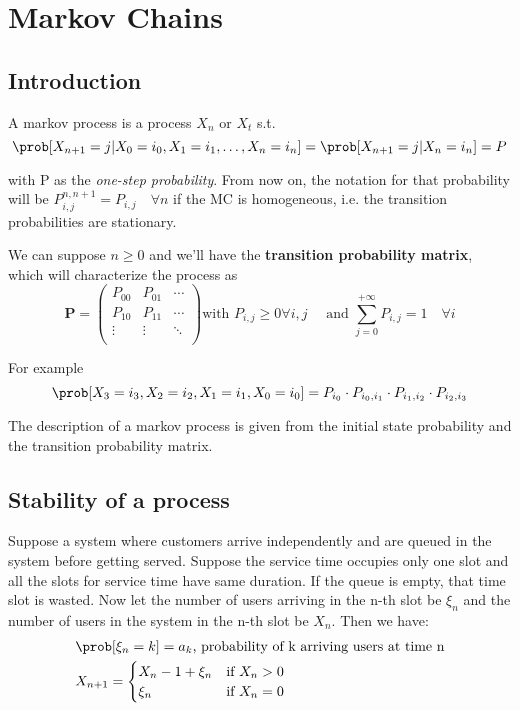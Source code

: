 \chapter{Markov Chains}

\section{Introduction}
A markov process is a process $X_n \text{ or } X_t$ s.t.
\begin{equation}
	\prob[X_{n+1} = j | X_0 = i_0, X_1 = i_1, \dots, X_n = i_n] = \prob[X_{n+1} = j | X_n=i_n] = P
\end{equation}

with P as the \textit{one-step probability}. From now on, the notation for that probability will be $P_{i,j}^{n,n+1}=P_{i,j} \quad \forall n$ if the MC is homogeneous, i.e. the transition probabilities are stationary.

We can suppose $n\ge 0$ and we'll have the \textbf{transition probability matrix}, which will characterize the process as
\begin{equation} \bm P=\begin{pmatrix}
	P_{00} & P_{01} & \cdots  \\
	P_{10} & P_{11} & \cdots \\
	\vdots & \vdots & \ddots  \\
 	\end{pmatrix}
	\text{with } P_{i,j}\ge 0 \forall i,j \quad \text{ and } \sum\limits_{j=0}^{+\infty}P_{i,j} = 1 \quad \forall i
\end{equation}

For example
\begin{equation}
	\prob[X_3 = i_3 , X_2 = i_2, X_1 = i_1, X_0 = i_0]=P_{i_0}\cdot P_{i_0,i_1}\cdot P_{i_1,i_2}\cdot P_{i_2,i_3}
\end{equation}

The description of a markov process is given from the initial state probability and the transition probability matrix.

\section{Stability of a process}
Suppose a system where customers arrive independently and are queued in the system before getting served.
Suppose the service time occupies only one slot and all the slots for service time have same duration.
If the queue is empty, that time slot is wasted.
Now let the number of users arriving in the n-th slot be $\xi_n$ and the number of users in
the system in the n-th slot  be $X_n$. Then we have:
 \begin{equation}
 	\begin{split}
 	&\prob[\xi_n=k] = a_k \text{, probability of k arriving users at time n}\\
  	&X_{n+1}=
		\begin{cases}
 			X_n -1 +\xi_n &  \text{if } X_n >0 \\
 			\xi_n 			 	&  \text{if } X_n = 0
 		\end{cases}
 	\end{split}
 \end{equation}

